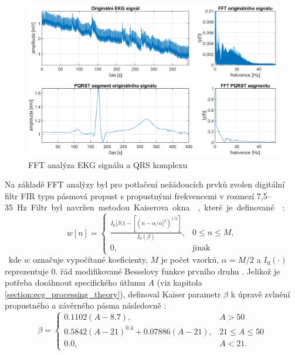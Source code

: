 \begin{figure}[h]
    \begin{center}
        \includegraphics[width=1\textwidth]{../assets/figures/spectral_analysis}
        \caption{FFT analýza EKG signálu a QRS komplexu}
        \label{fig:spectral_analysis}
    \end{center}
\end{figure}

Na základě FFT analýzy byl pro potlačení nežádoucích prvků zvolen digitální
filtr FIR typu pásmová propust s propustnými frekvencemi v rozmezí
7,5--35~\si\Hz. Filtr byl navržen metodou Kaiserova okna \cite{Chavan2006},
které je definované \cite{Oppenheim1999}:
\begin{equation}
    \label{eq:kaiser1}
    w[n] =
    \begin{cases}
        \frac{I_0[\beta(1-[(n-\alpha/\alpha]^2)^{1/2}]}{I_0(\beta)}, & 0 \leq n \leq M, \\
        0,                                                           & \text{jinak}
    \end{cases}
\end{equation}
kde $w$ označuje vypočítané koeficienty, $M$ je počet vzorků, $\alpha=M/2$ a
$I_0(\cdot)$ reprezentuje 0. řád modifikované Besselovy funkce prvního druhu
\cite{BesselFcn}. Jelikož je potřeba dosáhnout specifického útlumu $A$ (viz
kapitola \ref{section:ecg_processing_theory}), definoval Kaiser parametr $\beta$
k úpravě zvlnění propustného a závěrného pásma následovně \cite{Oppenheim1999}:
\begin{equation}
    \beta =
    \begin{cases}
        0.1102(A-8.7),                    & A > 50            \\
        0.5842(A-21)^0.4 + 0.07886(A-21), & 21 \leq A \leq 50 \\
        0.0,        & A < 21.
    \end{cases}
\end{equation}

